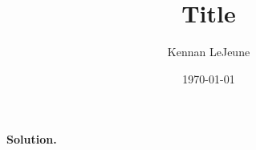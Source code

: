 \documentclass[12pt]{article}
\newenvironment{problem}[2][Problem]{\begin{trivlist}
\item[\hskip \labelsep {\bfseries #1}\hskip \labelsep {\bfseries #2.}]}{\end{trivlist}}
\begin{document}
\title{Title}
\author{Kennan LeJeune}
\date{\today}
\maketitle
    \begin{problem}{P1.10}

    \end{problem}
    \paragraph{Solution.}
        \Blindtext
\end{document}
